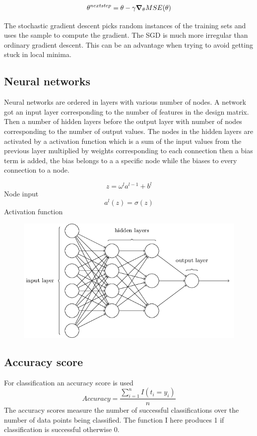 \documentclass[reprint,english,notitlepage]{revtex4-2}  %
\begin{document}
\[ \theta^{next step} = \theta - \gamma \grad_{\theta}MSE(\theta) \] 

The stochastic gradient descent picks random instances of the training sets and uses the sample to compute the gradient. The SGD is much more irregular than ordinary gradient descent. This can be an advantage when trying to avoid getting stuck in local minima. 

\subsection{Neural networks}
Neural networks are ordered in layers with various number of nodes. 
A network got an input layer corresponding to the number of features in the design matrix. Then a number of hidden layers before the output layer with number of nodes corresponding to the number of output values.
The nodes in the hidden layers are activated by a activation function which is a sum of the input values from the previous layer multiplied by weights corresponding to each connection then a bias term is added, the bias belongs to a a specific node while the biases to every connection to a node.

\[ z = \omega^la^{l-1} + b^l\]Node input 
\[ a^l(z) = \sigma(z)\] Activation function
\begin{figure}[!ht]
	\includegraphics[scale=0.25]{neuralnetarch}
\end{figure}

\subsection{Accuracy score}
For classification an accuracy score is used 
\[ Accuracy = \frac{\sum_{i=1}^{n}I(t_i=y_i)}{n}\]
The accuracy scores measure the number of successful classifications over the number of data points being classified. The function I here produces 1 if classification is successful otherwise 0. 
\end{document}
